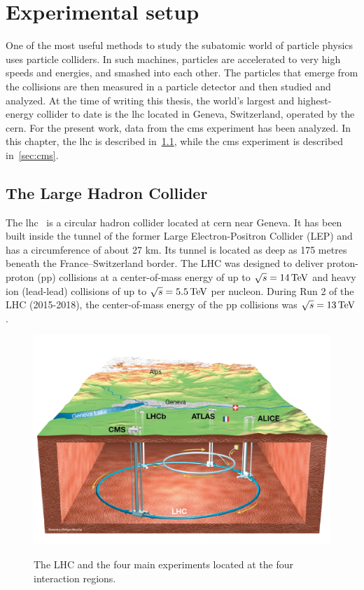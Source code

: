 \chapter{Experimental setup}

One of the most useful methods to study the subatomic world of particle physics uses particle colliders. In such machines, particles are accelerated to very high speeds and energies, and smashed into each other. The particles that emerge from the collisions are then measured in a particle detector and then studied and analyzed. At the time of writing this thesis, the world's largest and highest-energy collider to date is the \gls{lhc} located in Geneva, Switzerland, operated by the \gls{cern}. For the present work, data from the \gls{cms} experiment has been analyzed. In this chapter, the \gls{lhc} is described in~\ref{sec:lhc}, while the \gls{cms} experiment is described in~\ref{sec:cms}. 

\section{The Large Hadron Collider}
\label{sec:lhc}

The \gls{lhc}~\cite{Bruning:2004ej, Buning:2004wk,Benedikt:2004wm} is a circular hadron collider located at \gls{cern} near Geneva. It has been built inside the tunnel of the former Large Electron-Positron Collider (LEP) and has a circumference of about 27 km. Its tunnel is located as deep as 175 metres beneath the France–Switzerland border. The LHC was designed to deliver proton-proton (pp) collisions at a center-of-mass energy of up to $\sqrt{s} = 14\,\text{Te\hspace{-.08em}V}$ and heavy ion (lead-lead) collisions of up to $\sqrt{s} = 5.5\,\text{Te\hspace{-.08em}V}$ per nucleon. During Run 2 of the LHC (2015-2018), the center-of-mass energy of the pp collisions was $\sqrt{s} = 13\,\text{Te\hspace{-.08em}V}$.

\begin{figure}[!htb]
\centering
\includegraphics[width=0.75\linewidth]{plots/detector/LHC_overview.png}  \\
\caption[LHC overview]{The LHC and the four main experiments located at the four interaction regions.}
\label{fig:lhc-overview}
\end{figure}


